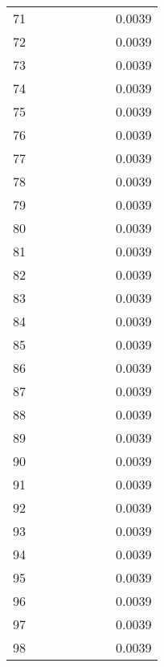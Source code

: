 \documentclass[12pt]{article}
\begin{document}
\begin{center}
\begin{longtable}{|c|c|c|c|c|c|c|c|}
                    71 &  &  &  &  &  &  & 0.0039 \\
                    72 &  &  &  &  &  &  & 0.0039 \\
                    73 &  &  &  &  &  &  & 0.0039 \\
                    74 &  &  &  &  &  &  & 0.0039 \\
                    75 &  &  &  &  &  &  & 0.0039 \\
                    76 &  &  &  &  &  &  & 0.0039 \\
                    77 &  &  &  &  &  &  & 0.0039 \\
                    78 &  &  &  &  &  &  & 0.0039 \\
                    79 &  &  &  &  &  &  & 0.0039 \\
                    80 &  &  &  &  &  &  & 0.0039 \\
                    81 &  &  &  &  &  &  & 0.0039 \\
                    82 &  &  &  &  &  &  & 0.0039 \\
                    83 &  &  &  &  &  &  & 0.0039 \\
                    84 &  &  &  &  &  &  & 0.0039 \\
                    85 &  &  &  &  &  &  & 0.0039 \\
                    86 &  &  &  &  &  &  & 0.0039 \\
                    87 &  &  &  &  &  &  & 0.0039 \\
                    88 &  &  &  &  &  &  & 0.0039 \\
                    89 &  &  &  &  &  &  & 0.0039 \\
                    90 &  &  &  &  &  &  & 0.0039 \\
                    91 &  &  &  &  &  &  & 0.0039 \\
                    92 &  &  &  &  &  &  & 0.0039 \\
                    93 &  &  &  &  &  &  & 0.0039 \\
                    94 &  &  &  &  &  &  & 0.0039 \\
                    95 &  &  &  &  &  &  & 0.0039 \\
                    96 &  &  &  &  &  &  & 0.0039 \\
                    97 &  &  &  &  &  &  & 0.0039 \\
                    98 &  &  &  &  &  &  & 0.0039 \\

\end{longtable}
\end{center}
\end{document}

